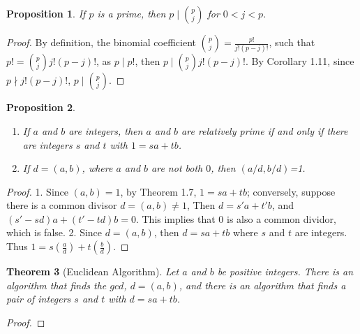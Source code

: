 \documentclass{article}
\makeatletter
\def\BState{\State\hskip-\ALG@thistlm}
\newtheorem{theorem}{Theorem}[section]
\newtheorem{proposition}[theorem]{Proposition}
\makeatother
\begin{document}
    \begin{proposition}
        If \(p\) is a prime, then \(p \mid \binom{p}{j}\) for \(0 < j < p\).
    \end{proposition}
    \begin{proof}
        By definition, the binomial coefficient \(\binom{p}{j}=\frac{p!}{j!(p-j)!}\), 
        such that \(p!=\binom{p}{j} j! (p-j)!\), as \(p \mid p!\), then \(p \mid \binom{p}{j}j!(p-j)!\). 
        By Corollary 1.11, since \(p \nmid j!(p-j)!\), \(p \mid \binom{p}{j}\).
    \end{proof} 
    \begin{proposition}
        \(\)
        \begin{enumerate}
            \item If \(a\) and \(b\) are integers, then \(a\) and \(b\) are relatively prime if and only if there are integers \(s\) and \(t\) with \(1=sa+tb\).
            \item If \(d=(a, b)\), where \(a\) and \(b\) are not both \(0\), then \((a/d, b/d)\)=1.
        \end{enumerate}
    \end{proposition}
    \begin{proof}
        1. Since \((a, b)=1\), by Theorem 1.7, \(1=sa+tb\); conversely, suppose there is a common divisor \(d=(a, b) \neq 1\), Then \(d=s'a+t'b\), and \((s'-sd)a + (t'-td)b=0\). This implies that \(0\) is also a common dividor, which is false.
        2. Since \(d=(a,b)\), then \(d=sa+tb\) where \(s\) and \(t\) are integers. Thus \(1=s(\frac{a}{d})+t(\frac{b}{d})\).
    \end{proof}
    \begin{theorem}[Euclidean Algorithm]
        Let \(a\) and \(b\) be positive integers. There is an algorithm that finds the 
        \(gcd\), \(d=(a,b)\), and there is an algorithm that finds a pair of integers 
        \(s\) and \(t\) with \(d=sa+tb\).
    \end{theorem}
    \begin{proof}
        
    \end{proof}
    \begin{algorithm}
        \caption{My algorithm}\label{euclid}
    \end{algorithm}
\end{document}

